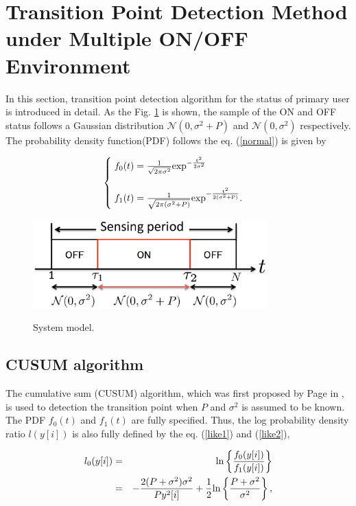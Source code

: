 \section{Transition Point Detection Method under Multiple ON/OFF Environment }    

In this section, transition point detection algorithm for the status of primary user is introduced in detail. As the Fig. \ref{system_model} is shown, the sample of the ON and OFF status follows a Gaussian distribution $\mathcal{N}(0,\sigma^2+P)$ and $\mathcal{N}(0,\sigma^2)$ respectively. The probability density function(PDF) follows the eq. (\ref{normal}) is given by

\begin{eqnarray}
\begin{cases}
\;f_0(t) = \frac{1}{\sqrt{2\pi\sigma^2}} \rm{exp}^{-\frac{t^2}{2\sigma^2}} \\
\; \\ \nonumber
\;f_1(t) = \frac{1}{\sqrt{2\pi(\sigma^2+P)}} \rm{exp}^{-\frac{t^2}{2(\sigma^2+P)}}.
\end{cases}
\label{normal}
\end{eqnarray}

\begin{center}
  \begin{figure}[t]
    \centering
    \includegraphics[width=90mm]{systemodel.eps}
    \label{system_model}
    \caption{\normalsize{System model.}}
  \end{figure}
\end{center} 

\subsection{CUSUM algorithm}
The cumulative sum (CUSUM) algorithm, which was first proposed by Page in \cite{ref:CUSUM}, is used to detection the transition point when $P$ and $\sigma^2$ is assumed to be known.
The PDF $f_0(t)$ and $f_1(t)$ are fully specified. Thus, the log probability density ratio $l(y[i])$ is also fully defined by the eq. (\ref{like1}) and (\ref{like2}),

\begin{eqnarray}
l_{0}(y[i]) &=& {\rm ln}\left\{\frac{f_0(y[i])}{f_1(y[i])}\right\} \label{like1} \\ 
&=& -\frac{2(P+\sigma^2)\sigma^2}{Py^2[i]} + \frac{1}{2}{\rm ln}\left\{\frac{P+\sigma^2}{\sigma^2}\right\}, \nonumber
\end{eqnarray}

